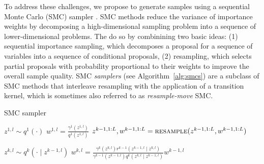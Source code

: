 \documentclass{article}
\theoremstyle{definition}
\begin{document}

To address these challenges, we propose to generate samples using a sequential Monte Carlo (SMC) sampler \citep{delmoral2006sequential}.
SMC methods \cite{doucet2001sequential} reduce the variance of importance weights by decomposing a high-dimensional sampling problem into a sequence of lower-dimensional problems. The do so by combinining two basic ideas: (1) sequential importance sampling, which decomposes a proposal for a sequence of variables into a sequence of conditional proposals, (2) resampling, which selects partial proposals with probability proportional to their weights to improve the overall sample quality. 
SMC \emph{samplers} (see  Algorithm~\ref{alg:smcs}) are a subclass of SMC methods that interleave resampling with the application of a transition kernel, which is sometimes also referred to as \emph{resample-move} SMC. 

\begin{algorithm}[!t]
  \caption{SMC sampler}
  \label{alg:smcs}
\begin{algorithmic}[1]
    \small
        \State $z^{1,l} \sim q^1(\cdot)$
        \State $w^{1,l} = \frac{\gamma^1(z^{1,l})}{q^1(z^{1,l})}$
    \EndFor
      \State$z^{k-1,1:L}, w^{k-1,1:L}=\textsc{resample}(z^{k-1,1:L}, w^{k-1,1:L})$

          \State $z^{k,l} \sim q^k(\cdot \mid z^{k-1,l})$\label{line:apg-propose}
          \State $w^{k,l} = \frac{\gamma^k(z^{k,l}) r^{k-1}(z^{k-1,l} \mid z^{k,l})}{\gamma^{k-1}(z^{k-1,l}) q^k(z^{k,l} \mid z^{k-1,l})}w^{k-1,l}$
      \EndFor
    \EndFor
\end{algorithmic}
\end{algorithm}
\end{document}

